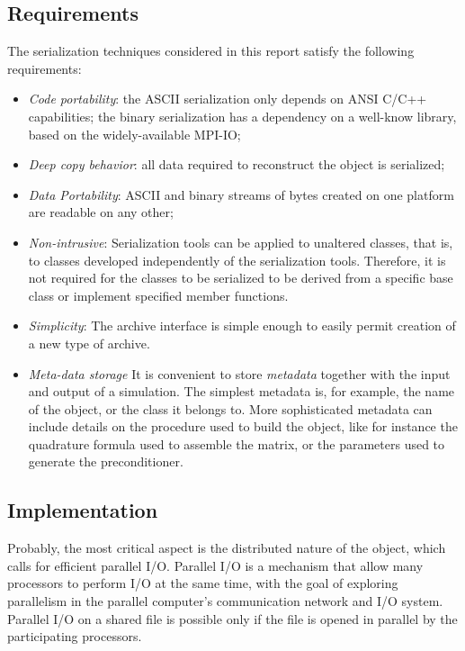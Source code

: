 \documentclass[11pt,relax]{SANDreport}
\begin{document}
\subsection{Requirements}

The serialization techniques considered in this report satisfy the
following requirements:
\begin{itemize}
\item
{\sl Code portability}: the ASCII serialization only depends on ANSI
C/C++ capabilities; the binary serialization has a dependency on a well-know
library, based on the widely-available MPI-IO;
\item
{\sl Deep copy behavior}: all data required to reconstruct the object is
serialized;
\item
{\sl Data Portability}: ASCII and binary streams of bytes created on one
platform are readable on any other;
\item
{\sl Non-intrusive}: Serialization tools can be applied to unaltered classes,
  that is, to classes developed independently of the serialization tools.
        Therefore, it is not required for the classes to be serialized to be
        derived from a specific base class or implement specified member
        functions.
\item
{\sl Simplicity}: The archive interface is simple enough to easily permit
creation of a new type of archive.
\item
{\sl Meta-data storage}
It is convenient to store {\sl metadata} together with the input and
output of a simulation. The simplest metadata is, for example, the name of the
object, or the class it belongs to. More sophisticated metadata can include
details on the procedure used to build the object, like for instance the
quadrature formula used to assemble the matrix, or the parameters used to
generate the preconditioner.
\end{itemize}

\subsection{Implementation}

Probably, the most critical aspect is the distributed nature of the object,
  which calls for efficient parallel I/O.
Parallel I/O is a mechanism that allow many
processors to perform I/O at the same time, with the goal of exploring
parallelism in the parallel computer's communication network and I/O system.
Parallel I/O on a shared file is possible only if the file is opened in
parallel by the participating processors.
\end{document}
